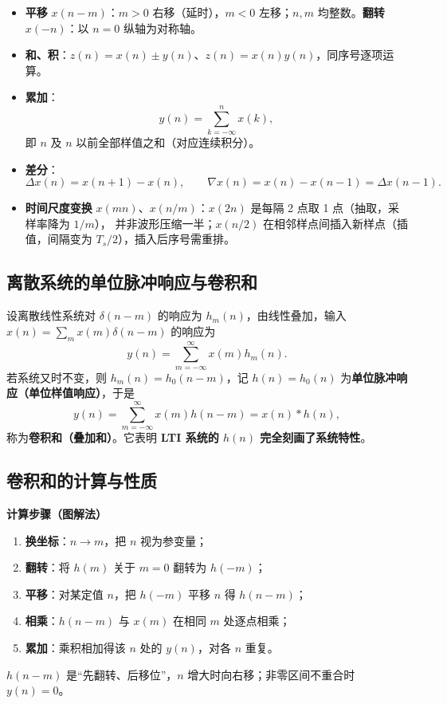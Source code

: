 \begin{itemize}
\item \textbf{平移} $x(n-m)$：$m>0$ 右移（延时），$m<0$ 左移；$n,m$ 均整数。\textbf{翻转} $x(-n)$：以 $n=0$ 纵轴为对称轴。
\item \textbf{和、积}：$z(n)=x(n)\pm y(n)$、$z(n)=x(n)y(n)$，同序号逐项运算。
\item \textbf{累加}：
\begin{equation}
y(n)=\sum_{k=-\infty}^{n}x(k),
\end{equation}
即 $n$ 及 $n$ 以前全部样值之和（对应连续积分）。
\item \textbf{差分}：
\begin{equation}
\Delta x(n)=x(n+1)-x(n),\qquad
\nabla x(n)=x(n)-x(n-1)=\Delta x(n-1).
\end{equation}
\item \textbf{时间尺度变换} $x(mn)$、$x(n/m)$：$x(2n)$ 是每隔 2 点取 1 点（抽取，采样率降为 $1/m$），
并非波形压缩一半；$x(n/2)$ 在相邻样点间插入新样点（插值，间隔变为 $T_s/2$），插入后序号需重排。
\end{itemize}

\subsection{离散系统的单位脉冲响应与卷积和}

设离散线性系统对 $\delta(n-m)$ 的响应为 $h_m(n)$，由线性叠加，输入 $x(n)=\sum_m x(m)\delta(n-m)$ 的响应为
\begin{equation}
y(n)=\sum_{m=-\infty}^{\infty}x(m)h_m(n).
\end{equation}
若系统又时不变，则 $h_m(n)=h_0(n-m)$，记 $h(n)=h_0(n)$ 为\textbf{单位脉冲响应（单位样值响应）}，于是
\begin{equation}
y(n)=\sum_{m=-\infty}^{\infty}x(m)h(n-m)=x(n)*h(n),
\end{equation}
称为\textbf{卷积和（叠加和）}。它表明 \textbf{LTI 系统的 $h(n)$ 完全刻画了系统特性}。

\subsection{卷积和的计算与性质}

\textbf{计算步骤（图解法）}
\begin{enumerate}
\item \textbf{换坐标}：$n\to m$，把 $n$ 视为参变量；
\item \textbf{翻转}：将 $h(m)$ 关于 $m=0$ 翻转为 $h(-m)$；
\item \textbf{平移}：对某定值 $n$，把 $h(-m)$ 平移 $n$ 得 $h(n-m)$；
\item \textbf{相乘}：$h(n-m)$ 与 $x(m)$ 在相同 $m$ 处逐点相乘；
\item \textbf{累加}：乘积相加得该 $n$ 处的 $y(n)$，对各 $n$ 重复。
\end{enumerate}
$h(n-m)$ 是“先翻转、后移位”，$n$ 增大时向右移；非零区间不重合时 $y(n)=0$。

